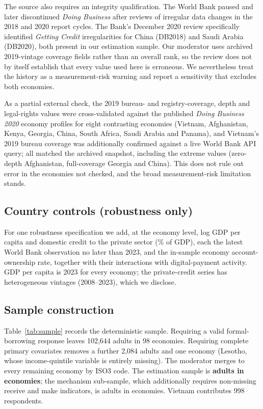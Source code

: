 The source also requires an integrity qualification. The World Bank paused and later
discontinued \emph{Doing Business} after reviews of irregular data changes in the 2018 and
2020 report cycles. The Bank's December 2020 review specifically identified \emph{Getting
Credit} irregularities for China (DB2018) and Saudi Arabia (DB2020), both present in our
estimation sample. Our moderator uses archived 2019-vintage coverage fields rather than an
overall rank, so the review does not by itself establish that every value used here is
erroneous. We nevertheless treat the history as a measurement-risk warning and report a
sensitivity that excludes both economies.

As a partial external check, the 2019 bureau- and registry-coverage, depth and legal-rights
values were cross-validated against the published \emph{Doing Business 2020} economy
profiles for eight contrasting economies (Vietnam, Afghanistan, Kenya, Georgia, China, South
Africa, Saudi Arabia and Panama), and Vietnam's 2019 bureau coverage was additionally
confirmed against a live World Bank API query; all matched the archived snapshot, including
the extreme values (zero-depth Afghanistan, full-coverage Georgia and China). This does not
rule out error in the economies not checked, and the broad measurement-risk limitation
stands.

\subsection{Country controls (robustness only)}

For one robustness specification we add, at the economy level, log GDP per capita and
domestic credit to the private sector (\% of GDP), each the latest World Bank observation no
later than 2023, and the in-sample economy account-ownership rate, together with their
interactions with digital-payment activity. GDP per capita is 2023 for every economy; the
private-credit series has heterogeneous vintages (2008--2023), which we disclose.

\subsection{Sample construction}

Table~\ref{tab:sample} records the deterministic sample. Requiring a valid formal-borrowing
response leaves 102{,}644 adults in 98 economies. Requiring complete primary covariates
removes a further 2{,}084 adults and one economy (Lesotho, whose income-quintile variable is
entirely missing). The moderator merges to every remaining economy by ISO3 code. The
estimation sample is \textbf{\NAdults{} adults in \NEconomies{} economies}; the mechanism
sub-sample, which additionally requires non-missing receive and make indicators, is
\NMechAdults{} adults in \NMechEconomies{} economies. Vietnam contributes 998 respondents.

